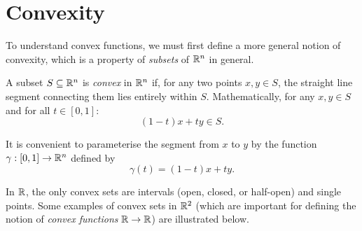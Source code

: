 \documentclass[../analysis1.tex]{subfiles}
\begin{document}
\chapter{Convexity}

To understand convex functions, we must first define a more general notion of convexity, which is a property of \textit{subsets} of $\mathbb{R}^n$ in general.

\begin{definition}
\label{def:convexset}
    \begin{shaded*}
        A subset $S \subseteq \mathbb{R}^n$ is \textit{convex} in $\mathbb{R}^n$ if, for any two points $x, y \in S$, the straight line segment connecting them lies entirely within $S$. Mathematically, for any $x,y\in S$ and for all $t \in [0,1]$:
        \[ (1-t)x + ty \in S. \]
    \end{shaded*}
\end{definition}

\begin{remark}
    It is convenient to parameterise the segment from $x$ to $y$ by the function $\gamma:[0,1]\to \mathbb{R}^n$ defined by \[\gamma(t)=(1-t)x+ty.\]
\end{remark}

In $\mathbb{R}$, the only convex sets are intervals (open, closed, or half-open) and single points. Some examples of convex sets in $\mathbb{R}^2$ (which are important for defining the notion of \textit{convex functions} $\mathbb{R}\to\mathbb{R}$) are illustrated below.

\vspace{1em}
\end{document}

